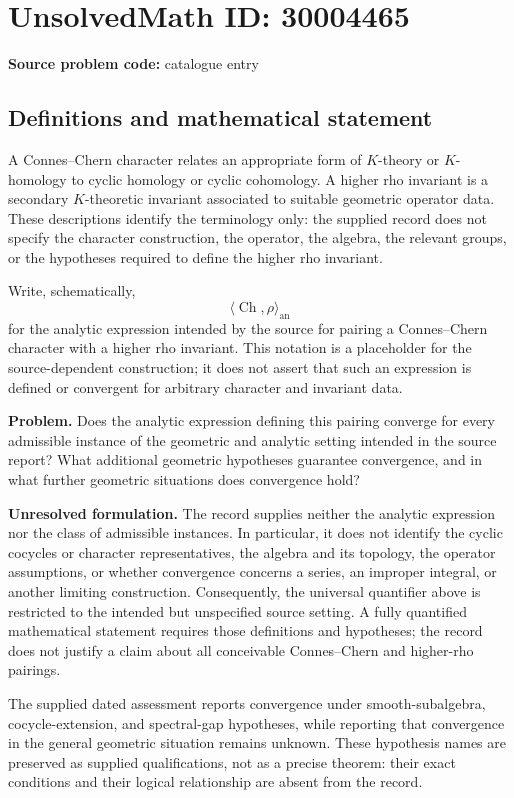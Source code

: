\documentclass[11pt]{article}
\begin{document}
\section*{UnsolvedMath ID: 30004465}
\textbf{Source problem code:} catalogue entry
\subsection{Definitions and mathematical statement}
A Connes--Chern character relates an appropriate form of \(K\)-theory or \(K\)-homology to cyclic homology or cyclic cohomology. A higher rho invariant is a secondary \(K\)-theoretic invariant associated to suitable geometric operator data. These descriptions identify the terminology only: the supplied record does not specify the character construction, the operator, the algebra, the relevant groups, or the hypotheses required to define the higher rho invariant.

Write, schematically,
\[
\bigl\langle \operatorname{Ch},\rho\bigr\rangle_{\mathrm{an}}
\]
for the analytic expression intended by the source for pairing a Connes--Chern character with a higher rho invariant. This notation is a placeholder for the source-dependent construction; it does not assert that such an expression is defined or convergent for arbitrary character and invariant data.

\textbf{Problem.} Does the analytic expression defining this pairing converge for every admissible instance of the geometric and analytic setting intended in the source report? What additional geometric hypotheses guarantee convergence, and in what further geometric situations does convergence hold?

\textbf{Unresolved formulation.} The record supplies neither the analytic expression nor the class of admissible instances. In particular, it does not identify the cyclic cocycles or character representatives, the algebra and its topology, the operator assumptions, or whether convergence concerns a series, an improper integral, or another limiting construction. Consequently, the universal quantifier above is restricted to the intended but unspecified source setting. A fully quantified mathematical statement requires those definitions and hypotheses; the record does not justify a claim about all conceivable Connes--Chern and higher-rho pairings.

The supplied dated assessment reports convergence under smooth-subalgebra, cocycle-extension, and spectral-gap hypotheses, while reporting that convergence in the general geometric situation remains unknown. These hypothesis names are preserved as supplied qualifications, not as a precise theorem: their exact conditions and their logical relationship are absent from the record.
\end{document}
